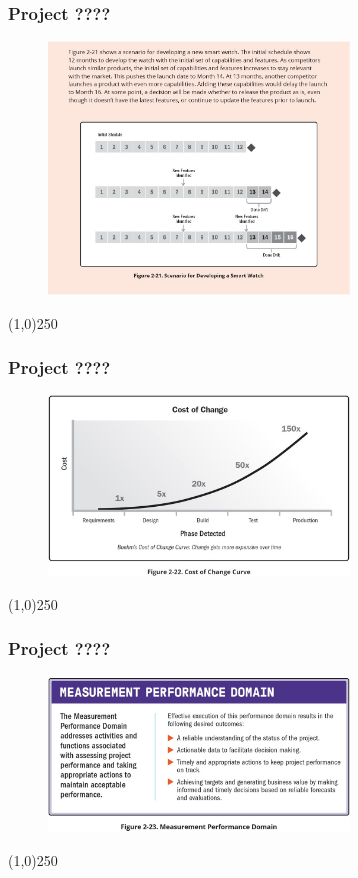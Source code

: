 \begin{frame}
\frametitle{Project ????}
 \begin{figure}
    \centering
        \includegraphics[width = 8cm]{../images/guide/Fig2-21.jpg}
    \label{guidefig:2-21}
 \end{figure}
\end{frame}
\begin{center}\line(1,0){250}\end{center}

\begin{frame}
\frametitle{Project ????}
 \begin{figure}
    \centering
        \includegraphics[width = 8cm]{../images/guide/Fig2-22.jpg}
    \label{guidefig:2-22}
 \end{figure}
\end{frame}
\begin{center}\line(1,0){250}\end{center}

\begin{frame}
\frametitle{Project ????}
 \begin{figure}
    \centering
        \includegraphics[width = 8cm]{../images/guide/Fig2-23.jpg}
    \label{guidefig:2-23}
 \end{figure}
\end{frame}
\begin{center}\line(1,0){250}\end{center}

